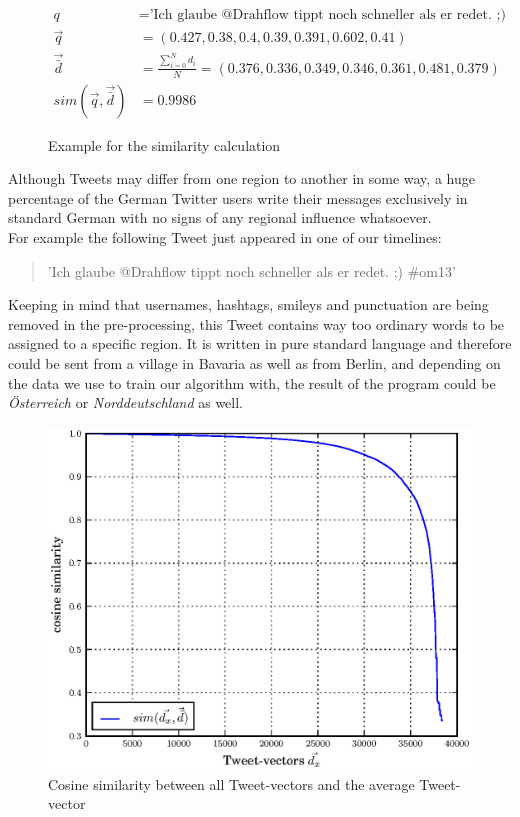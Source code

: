 \documentclass[../Main.tex]{subfiles}
\begin{document}
\begin{figure}[b]
 \begin{align*}
  q &= \textrm{'Ich glaube @Drahflow tippt noch schneller als er redet. ;) \#om13' } \\
  \vec{q} &= (0.427, 0.38, 0.4, 0.39, 0.391, 0.602,  0.41) \\ 
   \vec{\bar{d}} &= \frac{\sum^N_{i=0} d_i}{N} =  (0.376, 0.336, 0.349, 0.346, 0.361, 0.481,  0.379) \\
  sim(\vec{q}, \vec{\bar{d}}) &= 0.9986 
\end{align*}
  \caption{Example for the similarity calculation}
  \label{cos_sim_example}
\end{figure}
Although Tweets may differ from one region to another in some way, a huge percentage of the German Twitter users write their messages exclusively in standard German with no signs of any regional influence whatsoever. \\
For example the following Tweet just appeared in one of our timelines:
\begin{quote}
'Ich glaube @Drahflow tippt noch schneller als er redet. ;) \#om13'
\end{quote}
Keeping in mind that usernames, hashtags, smileys and punctuation are being removed in the pre-processing, this Tweet contains way too ordinary words to be assigned to a specific region. It is written in pure standard language and therefore could be sent from a village in Bavaria as well as from Berlin, and depending on the data we use to train our algorithm with, the result of the program could be \textit{Österreich} or \textit{Norddeutschland} as well.

\begin{figure}[t]
  \begin{center}
   \includegraphics[width=\columnwidth]{../img/cos-verteilung.eps}
    \caption{\label{cos_distribution} Cosine similarity between all Tweet-vectors and the average Tweet-vector}
  \end{center}
\end{figure}
\end{document}
